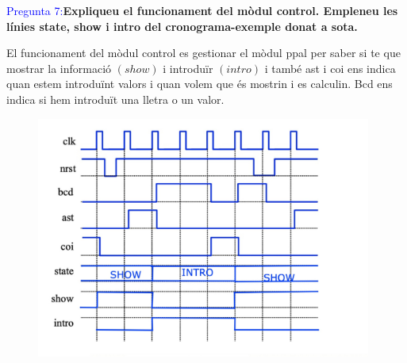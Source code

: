 \documentclass[12pt, a4papre]{article}
\begin{document}
	\textcolor{blue}{Pregunta 7:}\textbf{Expliqueu	el	funcionament	del	mòdul	control.	Empleneu	les	línies state,	show i	intro del	cronograma-exemple	donat	a	sota.	}
	
	El funcionament del mòdul control es gestionar el mòdul ppal per saber si te que mostrar la informació $(show)$ i introduïr $(intro)$ i també ast i coi ens indica quan estem introduïnt valors i quan volem que és mostrin i es calculin.
	Bcd ens indica si hem introduït una lletra o un valor.
	
	\begin{figure}[H]
		\begin{center}
		\includegraphics[width=110mm]{pregunta7.jpeg}
		\end{center}
	\end{figure}
	
	
	
\end{document}
